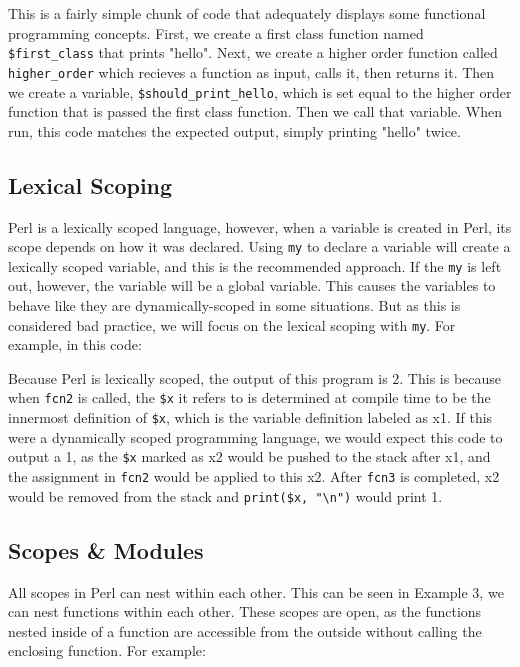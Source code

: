 \documentclass[12pt]{article}
\newcommand{\li}[1]{\lstinline{#1}} %
\begin{document}
	
	
	This is a fairly simple chunk of code that adequately displays some functional programming concepts. First, we create a first class function named \li{$first_class} that prints "hello". Next, we create a higher order function called \li{higher_order} which recieves a function as input, calls it, then returns it. Then we create a variable, \li{$should_print_hello}, which is set equal to the higher order function that is passed the first class function. Then we call that variable. When run, this code matches the expected output, simply printing "hello" twice.
	
	\subsection{Lexical Scoping}
	
	Perl is a lexically scoped language\cite{perldocs}, however, when a variable is created in Perl, its scope depends on how it was declared. Using \li{my} to declare a variable will create a lexically scoped variable, and this is the recommended approach. If the \li{my} is left out, however, the variable will be a global variable. This causes the variables to behave like they are dynamically-scoped in some situations. But as this is considered bad practice, we will focus on the lexical scoping with \li{my}. For example, in this code:
	
	
	
	Because Perl is lexically scoped, the output of this program is 2. This is because when \li{fcn2} is called, the \li{$x} it refers to is determined at compile time to be the innermost definition of \li{$x}, which is the variable definition labeled as x1. If this were a dynamically scoped programming language, we would expect this code to output a 1, as the \li{$x} marked as x2 would be pushed to the stack after x1, and the assignment in \li{fcn2} would be applied to this x2. After \li{fcn3} is completed, x2 would be removed from the stack and \li{print($x, "\n")} would print 1.
	
	\subsection{Scopes \& Modules}
	
	All scopes in Perl can nest within each other. This can be seen in Example 3, we can nest functions within each other. These scopes are open, as the functions nested inside of a function are accessible from the outside without calling the enclosing function. For example:
	
\end{document}

